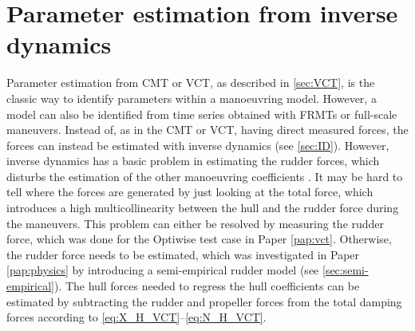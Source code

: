 \section{Parameter estimation from inverse dynamics} \label{sec:IDR}
Parameter estimation from CMT or VCT, as described in \autoref{sec:VCT}, is the classic way to identify parameters within a manoeuvring model. However, a model can also be identified from time series obtained with FRMTs or full-scale maneuvers. Instead of, as in the CMT or VCT, having direct measured forces, the forces can instead be estimated with inverse dynamics (see \autoref{sec:ID}). However, inverse dynamics has a basic problem in estimating the rudder forces, which disturbs the estimation of the other manoeuvring coefficients \cite{arakiEstimatingManeuveringCoefficients2012}. It may be hard to tell where the forces are generated by just looking at the total force, which introduces a high multicollinearity between the hull and the rudder force during the maneuvers.
This problem can either be resolved by measuring the rudder force, which was done for the Optiwise test case in Paper \ref{pap:vct}. Otherwise, the rudder force needs to be estimated, which was investigated in Paper \ref{pap:physics} by introducing a semi-empirical rudder model (see \autoref{sec:semi-empirical}). The hull forces needed to regress the hull coefficients can be estimated by subtracting the rudder and propeller forces from the total damping forces according to \autoref{eq:X_H_VCT}--\autoref{eq:N_H_VCT}.



